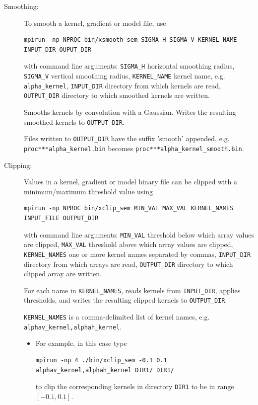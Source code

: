 \begin{description}
\item [Smoothing:] To smooth a kernel, gradient or model file, use
\begin{verbatim}
mpirun -np NPROC bin/xsmooth_sem SIGMA_H SIGMA_V KERNEL_NAME INPUT_DIR OUPUT_DIR
\end{verbatim}
with command line arguments:
\texttt{SIGMA\_H} horizontal smoothing radius,
\texttt{SIGMA\_V} vertical smoothing radius,
\texttt{KERNEL\_NAME} kernel name, e.g. \texttt{alpha\_kernel},
\texttt{INPUT\_DIR} directory from which kernels are read,
\texttt{OUTPUT\_DIR} directory to which smoothed kernels are written.

Smooths kernels by convolution with a Gaussian. Writes the resulting
smoothed kernels to \texttt{OUTPUT\_DIR}.

Files written to \texttt{OUTPUT\_DIR} have the suffix 'smooth' appended,
e.g. \texttt{proc***alpha\_kernel.bin} becomes \texttt{proc***alpha\_kernel\_smooth.bin}.

\item [Clipping:] Values in a kernel, gradient or model binary file can be clipped with a minimum/maximum threshold value using
\begin{verbatim}
mpirun -np NPROC bin/xclip_sem MIN_VAL MAX_VAL KERNEL_NAMES INPUT_FILE OUTPUT_DIR
\end{verbatim}
with command line arguments:
\texttt{MIN\_VAL} threshold below which array values are clipped,
\texttt{MAX\_VAL} threshold above which array values are clipped,
\texttt{KERNEL\_NAMES} one or more kernel names separated by commas,
\texttt{INPUT\_DIR} directory from which arrays are read,
\texttt{OUTPUT\_DIR} directory to which clipped array are written.

For each name in \texttt{KERNEL\_NAMES}, reads kernels from \texttt{INPUT\_DIR}, applies
thresholds, and writes the resulting clipped kernels to \texttt{OUTPUT\_DIR}.

\texttt{KERNEL\_NAMES} is a comma-delimited list of kernel names,
e.g. \texttt{alphav\_kernel,alphah\_kernel}.
\begin{itemize}
\item [] For example, in this case type
{\small
\begin{verbatim}
mpirun -np 4 ./bin/xclip_sem -0.1 0.1 alphav_kernel,alphah_kernel DIR1/ DIR1/
\end{verbatim}
}
to clip the corresponding kernels in directory \texttt{DIR1} to be in range $[-0.1,0.1]$.
\end{itemize}


\end{description}
